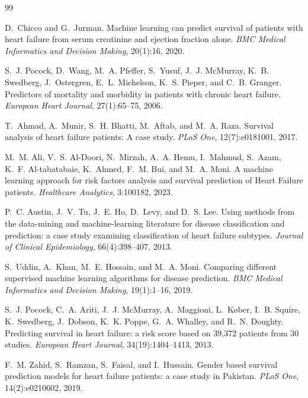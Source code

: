 \documentclass[12pt,a4paper]{article}
\begin{document}
\begin{thebibliography}{99}

D.~Chicco and G.~Jurman.
\newblock Machine learning can predict survival of patients with heart failure from serum creatinine and ejection fraction alone.
\newblock \emph{BMC Medical Informatics and Decision Making}, 20(1):16, 2020.

S.~J. Pocock, D.~Wang, M.~A. Pfeffer, S.~Yusuf, J.~J. McMurray, K.~B. Swedberg, J.~Ostergren, E.~L. Michelson, K.~S. Pieper, and C.~B. Granger.
\newblock Predictors of mortality and morbidity in patients with chronic heart failure.
\newblock \emph{European Heart Journal}, 27(1):65--75, 2006.

T.~Ahmad, A.~Munir, S.~H. Bhatti, M.~Aftab, and M.~A. Raza.
\newblock Survival analysis of heart failure patients: A case study.
\newblock \emph{PLoS One}, 12(7):e0181001, 2017.

M.~M. Ali, V.~S. Al-Doori, N.~Mirzah, A.~A. Hemu, I.~Mahmud, S.~Azam, K.~F. Al-tabatabaie, K.~Ahmed, F.~M. Bui, and M.~A. Moni.
\newblock A machine learning approach for risk factors analysis and survival prediction of Heart Failure patients.
\newblock \emph{Healthcare Analytics}, 3:100182, 2023.

P.~C. Austin, J.~V. Tu, J.~E. Ho, D.~Levy, and D.~S. Lee.
\newblock Using methods from the data-mining and machine-learning literature for disease classification and prediction: a case study examining classification of heart failure subtypes.
\newblock \emph{Journal of Clinical Epidemiology}, 66(4):398--407, 2013.

S.~Uddin, A.~Khan, M.~E. Hossain, and M.~A. Moni.
\newblock Comparing different supervised machine learning algorithms for disease prediction.
\newblock \emph{BMC Medical Informatics and Decision Making}, 19(1):1--16, 2019.

S.~J. Pocock, C.~A. Ariti, J.~J. McMurray, A.~Maggioni, L.~K{\o}ber, I.~B. Squire, K.~Swedberg, J.~Dobson, K.~K. Poppe, G.~A. Whalley, and R.~N. Doughty.
\newblock Predicting survival in heart failure: a risk score based on 39,372 patients from 30 studies.
\newblock \emph{European Heart Journal}, 34(19):1404--1413, 2013.

F.~M. Zahid, S.~Ramzan, S.~Faisal, and I.~Hussain.
\newblock Gender based survival prediction models for heart failure patients: a case study in Pakistan.
\newblock \emph{PLoS One}, 14(2):e0210602, 2019.


\end{thebibliography}
\end{document}
